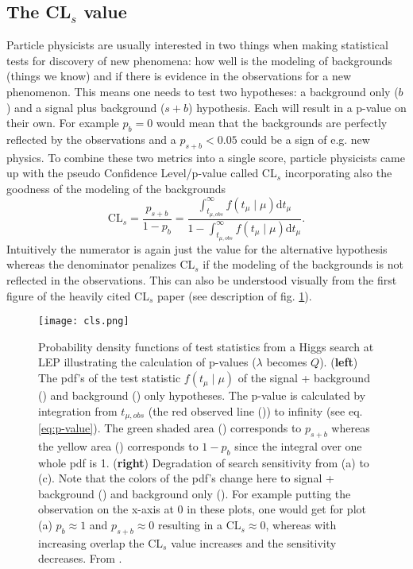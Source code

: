 \subsection{The CL$_s$ value}\label{sec:cls}

Particle physicists are usually interested in two things when making statistical tests for discovery of new phenomena: how well is the modeling of backgrounds (things we know) and if there is evidence in the observations for a new phenomenon. This means one needs to test two hypotheses: a background only ($b$) and a signal plus background ($s+b$) hypothesis. Each will result in a p-value on their own. For example $p_{b}=0$ would mean that the backgrounds are perfectly reflected by the observations and a $p_{s+b} < 0.05$ could be a sign of e.g. new physics. To combine these two metrics into a single score, particle physicists came up with the pseudo Confidence Level/p-value called CL$_s$ incorporating also the goodness of the modeling of the backgrounds 
\begin{equation}
    \mathrm{CL}_s=\frac{p_{s+b}}{1-p_{b}}=
    \frac
    {\int_{t_{\mu ,obs}}^{\infty} 
    f(t_\mu \mid \mu) \mathrm{d}t_\mu}
    {1-\int_{t_{\mu ,obs}}^{\infty} 
    f(t_\mu \mid \mu) \mathrm{d}t_\mu}.
\end{equation}
Intuitively the numerator is again just the value for the alternative hypothesis whereas the denominator penalizes CL$_s$ if the modeling of the backgrounds is not reflected in the observations. This can also be understood visually from the first figure of the heavily cited CL$_s$ paper \citep{read2002presentation} (see description of fig. \ref{fig:cls}).
\begin{figure}
    \centering
    \texttt{[image: cls.png]}
        \caption[]{Probability density functions of test statistics from a Higgs search at LEP illustrating the calculation of p-values ($\lambda$ becomes $Q$). (\textbf{left}) The pdf's of the test statistic $f(t_\mu \mid \mu)$ of the signal + background ({\color[HTML]{804000}{$\diagup$}}) and background ({\color[HTML]{2100FF}{$\diagup$}}) only hypotheses. The p-value is calculated by integration from $t_{\mu,obs}$ (the red observed line ({\color[HTML]{FF0000}{$\diagup$}})) to infinity (see eq. \ref{eq:p-value}). The green shaded area () corresponds to $p_{s+b}$ whereas the yellow area () corresponds to $1-p_b$ since the integral over one whole pdf is 1. (\textbf{right}) Degradation of search sensitivity from (a) to (c). Note that the colors of the pdf's change here to signal + background () and background only (). For example putting the observation on the x-axis at 0 in these plots, one would get for plot (a) $p_{b}\approx 1$ and $p_{s+b}\approx 0$ resulting in a CL$_s\approx 0$, whereas with increasing overlap the CL$_s$ value increases and the sensitivity decreases.
        From \citep{read2002presentation}.}
    \label{fig:cls}    
\end{figure}



